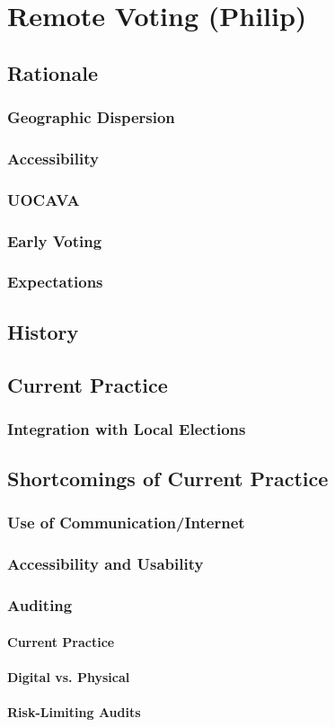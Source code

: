 \chapter{Remote Voting (Philip)}
\label{chapter:remote_voting}

\section{Rationale}
\subsection{Geographic Dispersion}
\subsection{Accessibility}
\subsection{UOCAVA}
\subsection{Early Voting}
\subsection{Expectations}
\section{History}
\section{Current Practice}
\subsection{Integration with Local Elections}
\section{Shortcomings of Current Practice}
\subsection{Use of Communication/Internet}
\subsection{Accessibility and Usability}
\subsection{Auditing}
\subsubsection{Current Practice}
\subsubsection{Digital vs. Physical}
\subsubsection{Risk-Limiting Audits}
